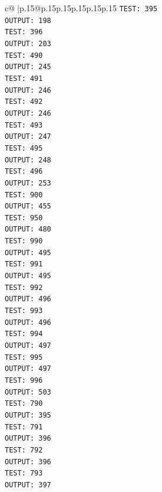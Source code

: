 \documentclass{article}
\begin{document}
{\begin{supertabular}{c@{$\;$}|p{.15\linewidth}@{}p{.15\linewidth}p{.15\linewidth}p{.15\linewidth}p{.15\linewidth}p{.15\linewidth}}
{{{\texttt{TEST: 395} \\
\texttt{OUTPUT: 198} \\
\texttt{TEST: 396} \\
\texttt{OUTPUT: 203} \\
\texttt{TEST: 490} \\
\texttt{OUTPUT: 245} \\
\texttt{TEST: 491} \\
\texttt{OUTPUT: 246} \\
\texttt{TEST: 492} \\
\texttt{OUTPUT: 246} \\
\texttt{TEST: 493} \\
\texttt{OUTPUT: 247} \\
\texttt{TEST: 495} \\
\texttt{OUTPUT: 248} \\
\texttt{TEST: 496} \\
\texttt{OUTPUT: 253} \\
\texttt{TEST: 900} \\
\texttt{OUTPUT: 455} \\
\texttt{TEST: 950} \\
\texttt{OUTPUT: 480} \\
\texttt{TEST: 990} \\
\texttt{OUTPUT: 495} \\
\texttt{TEST: 991} \\
\texttt{OUTPUT: 495} \\
\texttt{TEST: 992} \\
\texttt{OUTPUT: 496} \\
\texttt{TEST: 993} \\
\texttt{OUTPUT: 496} \\
\texttt{TEST: 994} \\
\texttt{OUTPUT: 497} \\
\texttt{TEST: 995} \\
\texttt{OUTPUT: 497} \\
\texttt{TEST: 996} \\
\texttt{OUTPUT: 503} \\
\texttt{TEST: 790} \\
\texttt{OUTPUT: 395} \\
\texttt{TEST: 791} \\
\texttt{OUTPUT: 396} \\
\texttt{TEST: 792} \\
\texttt{OUTPUT: 396} \\
\texttt{TEST: 793} \\
\texttt{OUTPUT: 397} \\
}}}
\end{supertabular}}
\end{document}
